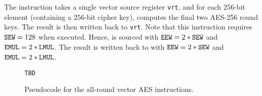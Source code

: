 The  instruction takes a single
vector source register {\tt vrt}, and for each $256$-bit element
(containing a $256$-bit cipher key),
computes the final two AES-256 round keys.
The result is then written back to {\tt vrt}.
Note that this instruction requires ${\tt SEW}=128$ when executed.
Hence, \vrt is sourced with ${\tt EEW}=2*{\tt SEW}$ and ${\tt EMUL}=2*{\tt LMUL}$.
The result is written back to \vrt with
${\tt EEW}=2*{\tt SEW}$ and ${\tt EMUL}=2*{\tt LMUL}$.


\begin{figure}[h]
\begin{lstlisting}[language=pseudo]
TBD
\end{lstlisting}
\caption{Pseudocode for the all-round vector AES instructions.}
\label{fig:pseudo:aes:vector:all-round}
\end{figure}

